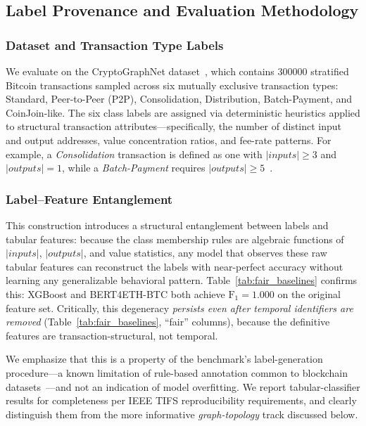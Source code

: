 \documentclass[journal]{IEEEtran}
\begin{document}

\subsection{Label Provenance and Evaluation Methodology}
\label{subsec:label_provenance}

\subsubsection{Dataset and Transaction Type Labels}
We evaluate on the CryptoGraphNet dataset~\cite{cryptographnet2024}, which contains
\num{300000} stratified Bitcoin transactions sampled across six mutually exclusive
transaction types: Standard, Peer-to-Peer (P2P), Consolidation, Distribution,
Batch-Payment, and CoinJoin-like.
The six class labels are assigned via deterministic heuristics applied to
structural transaction attributes---specifically, the number of distinct input
and output addresses, value concentration ratios, and fee-rate patterns.
For example, a \emph{Consolidation} transaction is defined as one with
$|\mathit{inputs}| \geq 3$ and $|\mathit{outputs}| = 1$, while a
\emph{Batch-Payment} requires $|\mathit{outputs}| \geq 5$~\cite{cryptographnet2024}.

\subsubsection{Label--Feature Entanglement}
This construction introduces a structural entanglement between labels and tabular
features: because the class membership rules are algebraic functions of
$|\mathit{inputs}|$, $|\mathit{outputs}|$, and value statistics, any model
that observes these raw tabular features can reconstruct the labels
with near-perfect accuracy without learning any generalizable behavioral
pattern.
Table~\ref{tab:fair_baselines} confirms this: XGBoost and
BERT4ETH-BTC both achieve $\text{F}_1 = 1.000$ on the original feature set.
Critically, this degeneracy \emph{persists even after temporal identifiers
are removed} (Table~\ref{tab:fair_baselines}, ``fair'' columns), because
the definitive features are transaction-structural, not temporal.

We emphasize that this is a property of the benchmark's label-generation
procedure---a known limitation of rule-based annotation common to
blockchain datasets~\cite{Jourdan2019,Akcora2022}---and not an indication
of model overfitting.
We report tabular-classifier results for completeness per IEEE TIFS
reproducibility requirements, and clearly distinguish them from the
more informative \emph{graph-topology} track discussed below.
\end{document}
